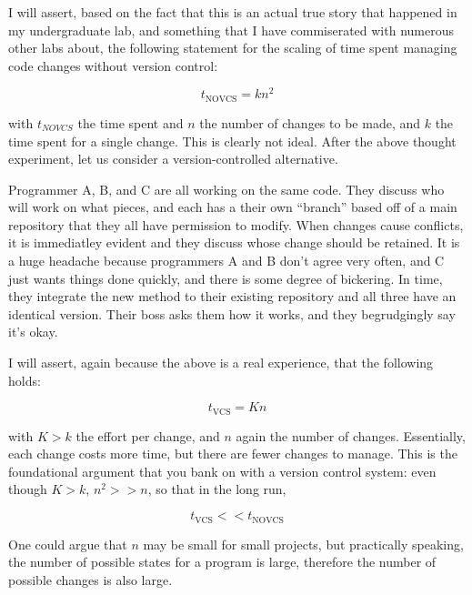\par{
I will assert, based on the fact that this is an actual true story that
happened in my undergraduate lab, and something that I have commiserated with
numerous other labs about, the following statement for the scaling of
time spent managing code changes without version control:

\begin{equation}
t_{\text{NOVCS}} = k n^2
\end{equation}

with $t_{NOVCS}$ the time spent and $n$ the number of changes to be made, and
$k$ the time spent for a single change. This
is clearly not ideal. After the above thought experiment, let us consider a
version-controlled alternative.
}

\par{
Programmer A, B, and C are all working on the same code. They discuss who will
work on what pieces, and each has a their own ``branch'' based off of a main
repository that they all have permission to modify. When changes cause
conflicts, it is immediatley evident and they discuss whose change should be
retained. It is a huge headache because programmers A and B don't agree very
often, and C just wants things done quickly, and there is some degree of
bickering. In time, they integrate the new method to their existing repository
and all three have an identical version. Their boss asks them how it works,
and they begrudgingly say it's okay. 
}

\par{
I will assert, again because the above is a real experience, that the
following holds:

\begin{equation}
t_{\text{VCS}} = K n
\end{equation}

with $K > k$ the effort per change, and $n$ again the number of changes.
Essentially, each change costs more time, but there are fewer changes to
manage. This is the foundational argument that you bank on with a version
control system: even though $K > k$, $n^2 >> n$, so that in the long run,

\begin{equation}
t_{\text{VCS}} << t_{\text{NOVCS}}
\end{equation}

One could argue that $n$ may be small for small projects, but practically
speaking, the number of possible states for a program is large, therefore the
number of possible changes is also large. 
}

